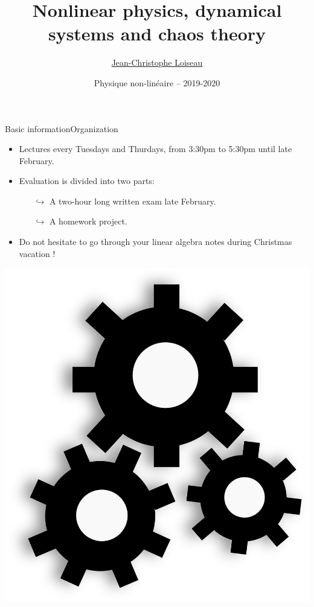 \documentclass[usenames,dvipsnames,svgnames,10pt,aspectratio=169]{beamer}
\title[Nonlinear physics] %
{
	Nonlinear physics, dynamical \\
	systems and chaos theory
}
\author[J.-Ch.~Loiseau] %
{
	\underline{Jean-Christophe Loiseau}
}
\institute[unused]
{
	\url{jean-christophe.loiseau@ensam.eu} \\
	Laboratoire DynFluid \\
	Arts et M\'etiers, France.
}
\date[unused]{Physique non-lin\'eaire -- 2019-2020}
\begin{document}
\titleframe	%


\begin{frame}[t, c]{Basic information}{Organization}
	\begin{minipage}{.68\textwidth}
		\begin{itemize}
			\item Lectures every Tuesdays and Thurdays, from 3:30pm to 5:30pm until late February.

			\bigskip

			\item Evaluation is divided into two parts:
			\begin{itemize}
				\item[\( \hookrightarrow \)] A two-hour long written exam late February.
				\item[\( \hookrightarrow \)] A homework project.
			\end{itemize}

			\medskip

			\item Do not hesitate to go through your linear algebra notes during Christmas vacation !
		\end{itemize}
	\end{minipage}%
	\hfill
	\begin{minipage}{.28\textwidth}
		\centering
		\includegraphics[width=\textwidth]{Gears}
	\end{minipage}

	\vspace{1cm}
\end{frame}
\end{document}
